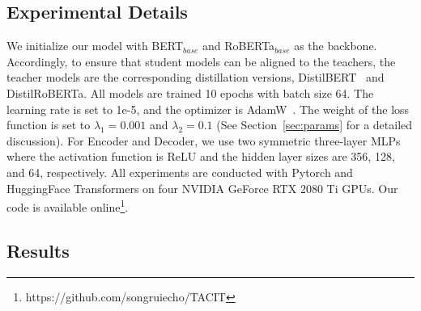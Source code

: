 \documentclass[letterpaper]{article} %
\begin{document}
\subsection{Experimental Details}\label{sec:details}
We initialize our model with BERT$_{base}$ and RoBERTa$_{base}$ as the backbone. Accordingly, to ensure that student models can be aligned to the teachers, the teacher models are the corresponding distillation versions, DistilBERT~\cite{DistilBERT} and DistilRoBERTa. All models are trained 10 epochs with batch size 64. The learning rate is set to 1e-5, and the optimizer is AdamW~\cite{LoshchilovH19}. The weight of the loss function is set to $\lambda_1=0.001$ and $\lambda_2=0.1$ (See Section~\ref{sec:params} for a detailed discussion). For Encoder and Decoder, we use two symmetric three-layer MLPs where the activation function is ReLU and the hidden layer sizes are 356, 128, and 64, respectively. All experiments are conducted with Pytorch and HuggingFace Transformers on four NVIDIA GeForce RTX 2080 Ti GPUs. Our code is available online\footnote{https://github.com/songruiecho/TACIT}.

\subsection{Results}\label{sec:results}
\end{document}
